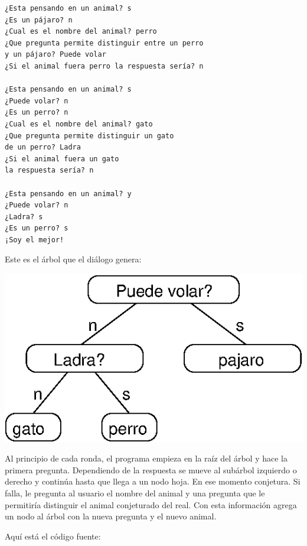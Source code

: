 \beforeverb 
\begin{verbatim}
¿Esta pensando en un animal? s
¿Es un pájaro? n
¿Cual es el nombre del animal? perro
¿Que pregunta permite distinguir entre un perro 
y un pájaro? Puede volar
¿Si el animal fuera perro la respuesta sería? n

¿Esta pensando en un animal? s
¿Puede volar? n
¿Es un perro? n
¿Cual es el nombre del animal? gato
¿Que pregunta permite distinguir un gato 
de un perro? Ladra
¿Si el animal fuera un gato 
la respuesta sería? n

¿Esta pensando en un animal? y
¿Puede volar? n
¿Ladra? s
¿Es un perro? s
¡Soy el mejor!

\end{verbatim}
\afterverb Este es el árbol que el diálogo genera:

\beforefig \centerline{\includegraphics{illustrations/tree5}}
\afterfig

Al principio de cada ronda, el programa empieza en la raíz del árbol
y hace la primera pregunta. Dependiendo de la respuesta se mueve al
subárbol izquierdo o derecho y continúa hasta que llega a un nodo
hoja. En ese momento conjetura. Si falla, le pregunta al usuario el
nombre del animal y una pregunta que le permitiría distinguir el animal
conjeturado del real. Con esta información agrega un nodo al árbol
con la nueva pregunta y el nuevo animal.

Aquí está el código fuente:


